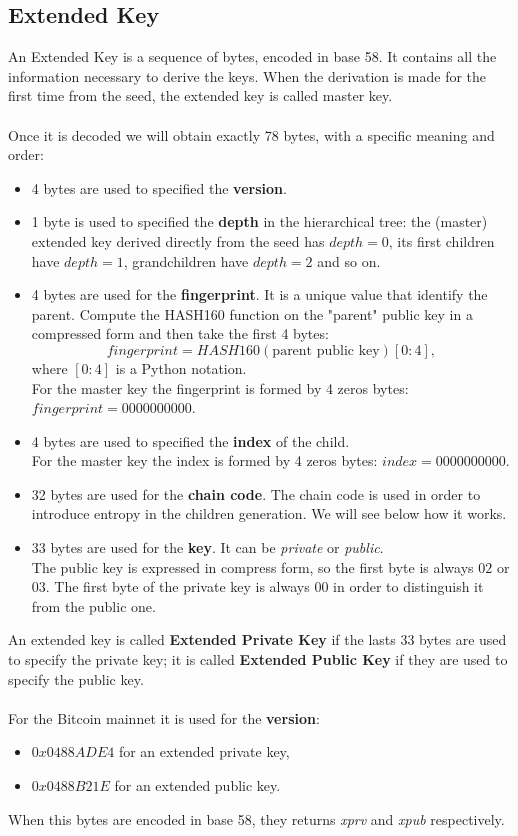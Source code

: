 \subsection{Extended Key}
An Extended Key is a sequence of bytes, encoded in base 58. It contains all the information necessary to derive the keys. When the derivation is made for the first time from the seed, the extended key is called master key.
\\ \\
Once it is decoded we will obtain exactly 78 bytes, with a specific meaning and order:
\begin{itemize}[label=$\circledast$]
	\item 4 bytes are used to specified the \textbf{version}.
	\item 1 byte is used to specified the \textbf{depth} in the hierarchical tree: the (master) extended key derived directly from the seed has $depth=0$, its first children have $depth=1$, grandchildren have $depth=2$ and so on.
	\item 4 bytes are used for the \textbf{fingerprint}. It is a unique value that identify the parent. Compute the HASH160 function on the "parent" public key in a compressed form and then take the first 4 bytes:
	\begin{equation*}
	fingerprint=HASH160(\text{parent public key})[0:4],
	\end{equation*}
	where $[0:4]$ is a Python notation.\\
	For the master key the fingerprint is formed by 4 zeros bytes: $fingerprint=0000000000$.
	\item 4 bytes are used to specified the \textbf{index} of the child. \\
	For the master key the index is formed by 4 zeros bytes: $index=0000000000$.
	\item 32 bytes are used for the \textbf{chain code}. The chain code is used in order to introduce entropy in the children generation. We will see below how it works.
	\item 33 bytes are used for the \textbf{key}. It can be \textit{private} or \textit{public}. \\ The public key is expressed in compress form, so the first byte is always $02$ or $03$. The first byte of the private key is always $00$ in order to distinguish it from the public one.\\
\end{itemize}
An extended key is called \textbf{Extended Private Key} if the lasts 33 bytes are used to specify the private key; it is called \textbf{Extended Public Key} if they are used to specify the public key.
\\ \\
For the Bitcoin mainnet it is used for the \textbf{version}: 
\begin{itemize}
	\item $0x0488ADE4$ for an extended private key,
	\item $0x0488B21E$ for an extended public key.
\end{itemize}
When this bytes are encoded in base 58, they returns \textit{xprv} and \textit{xpub} respectively.

